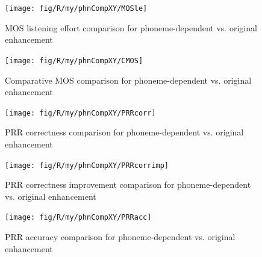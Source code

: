 \begin{figure}[H]
\noindent \begin{centering}
\texttt{[image: fig/R/my/phnCompXY/MOSle]}
\par\end{centering}

\protect\caption{\label{fig:mosle-comparison-phn}\acs{MOS} listening effort comparison
for phoneme-dependent vs. original enhancement}
\end{figure}


\begin{figure}[H]
\noindent \begin{centering}
\texttt{[image: fig/R/my/phnCompXY/CMOS]}
\par\end{centering}

\protect\caption{\label{fig:cmos-comparison-phn}Comparative \acs{MOS} comparison
for phoneme-dependent vs. original enhancement}
\end{figure}


\begin{figure}[H]
\noindent \begin{centering}
\texttt{[image: fig/R/my/phnCompXY/PRRcorr]}
\par\end{centering}

\protect\caption{\label{fig:prrcorr-comparison-phn}\acs{PRR} correctness comparison
for phoneme-dependent vs. original enhancement}
\end{figure}


\begin{figure}[H]
\noindent \begin{centering}
\texttt{[image: fig/R/my/phnCompXY/PRRcorrimp]}
\par\end{centering}

\protect\caption{\label{fig:prrcorrimp-comparison-phn}\acs{PRR} correctness improvement
comparison for phoneme-dependent vs. original enhancement}
\end{figure}


\begin{figure}[H]
\noindent \begin{centering}
\texttt{[image: fig/R/my/phnCompXY/PRRacc]}
\par\end{centering}

\protect\caption{\label{fig:prracc-comparison-phn}\acs{PRR} accuracy comparison for
phoneme-dependent vs. original enhancement}
\end{figure}


